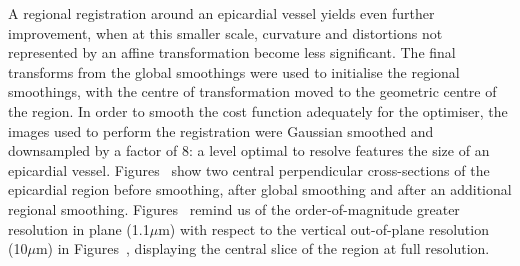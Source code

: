     A regional registration around an epicardial vessel yields even further improvement, when at this smaller scale, curvature and distortions not represented by an affine transformation become less significant. The final transforms from the global smoothings were used to initialise the regional smoothings, with the centre of transformation moved to the geometric centre of the region. In order to smooth the cost function adequately for the optimiser, the images used to perform the registration were Gaussian smoothed and downsampled by a factor of 8: a level optimal to resolve features the size of an epicardial vessel. Figures~ show two central perpendicular cross-sections of the epicardial region before smoothing, after global smoothing and after an additional regional smoothing. Figures~ remind us of the order-of-magnitude greater resolution in plane (1.1$\mu$m) with respect to the vertical out-of-plane resolution (10$\mu$m) in Figures~, displaying the central slice of the region at full resolution.
    
